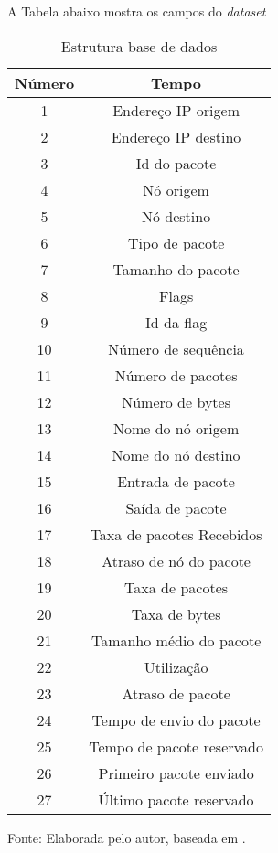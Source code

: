 A Tabela abaixo mostra os campos do \textit{dataset} 

\begin{table}[!b]
	\centering
	\begin{threeparttable}
		\caption{Estrutura base de dados \cite{DataMining}}
		\label{Tab:DataMining}
		\begin{tabular}{c c }
			\toprule
			\textbf{Número} & \textbf{Tempo}
			\\ \midrule
			1 &  Endereço IP origem  \\ \midrule
			2 &  Endereço IP destino  \\ \midrule
			3 &  Id do pacote  \\ \midrule
			4 &  Nó origem  \\ \midrule
			5 &  Nó destino  \\ \midrule
			6 &  Tipo de pacote  \\ \midrule
			7 &  Tamanho do pacote  \\ \midrule
			8 &  Flags  \\ \midrule
			9 &   Id da flag  \\ \midrule
			10 &  Número de sequência  \\ \midrule
			11 &  Número de pacotes  \\ \midrule
			12 &  Número de bytes  \\ \midrule
			13 &  Nome do nó origem  \\ \midrule
			14 &  Nome do nó destino  \\ \midrule
			15 &  Entrada de pacote  \\ \midrule
			16 &  Saída de pacote  \\ \midrule
			17 &  Taxa de pacotes Recebidos \\ \midrule%
			18 &  Atraso de nó do pacote  \\ \midrule
			19 &  Taxa de pacotes\\ \midrule
			20 &  Taxa de bytes  \\ \midrule
			21 &  Tamanho  médio do pacote  \\ \midrule
			22 &  Utilização  \\ \midrule
			23 &  Atraso de pacote  \\ \midrule
			24 &  Tempo de envio do pacote  \\ \midrule
			25 &  Tempo de pacote reservado  \\ \midrule
			26 &  Primeiro pacote enviado  \\ \midrule
			27 &  Último pacote reservado \\ \bottomrule
		\end{tabular}
		{Fonte: Elaborada pelo autor, baseada em \cite{DataMining}.}
	\end{threeparttable}
\end{table}


